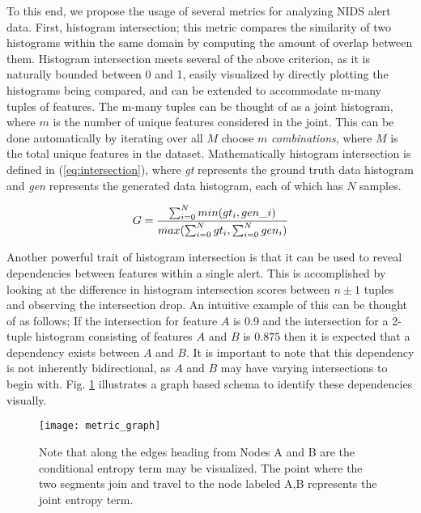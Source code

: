 To this end, we propose the usage of several metrics for analyzing NIDS alert data. First, histogram intersection; this metric compares the similarity of two histograms within the same domain by computing the amount of overlap between them. Histogram intersection meets several of the above criterion, as it is naturally bounded between 0 and 1, easily visualized by directly plotting the histograms being compared, and can be extended to accommodate m-many tuples of features. The m-many tuples can be thought of as a joint histogram, where $m$ is the number of unique features considered in the joint. This can be done automatically by iterating over all $M$ choose $m$ \emph{combinations}, where $M$ is the total unique features in the dataset. Mathematically histogram intersection is defined in (\ref{eq:intersection}), where \emph{gt} represents the ground truth data histogram and \emph{gen} represents the generated data histogram, each of which has $N$ samples.

\begin{equation}
\label{eq:intersection}
	G = {{\sum_{i=0}^{N} min(gt_i, gen\_i)} \over {max(\sum_{i=0}^{N} gt_i, \sum_{i=0}^{N} gen_i)}}
\end{equation}

Another powerful trait of histogram intersection is that it can be used to reveal dependencies between features within a single alert. This is accomplished by looking at the difference in histogram intersection scores between $n\pm1$ tuples and observing the intersection drop. An intuitive example of this can be thought of as follows; If the intersection for feature $A$ is 0.9 and the intersection for a 2-tuple histogram consisting of features $A$ and $B$ is $0.875$ then it is expected that a dependency exists between $A$ and $B$. It is important to note that this dependency is not inherently bidirectional, as $A$ and $B$ may have varying intersections to begin with. Fig. \ref{fig:metric_graph} illustrates a graph based schema to identify these dependencies visually. 

\begin{figure}[!htbp]
	\centering%
	\texttt{[image: metric\_graph]}
	\caption{
		Note that along the edges heading from Nodes A and B are the conditional entropy term may be visualized. The point where the two segments join and travel to the node labeled A,B represents the joint entropy term.
	}
	\label{fig:metric_graph}
\end{figure}

